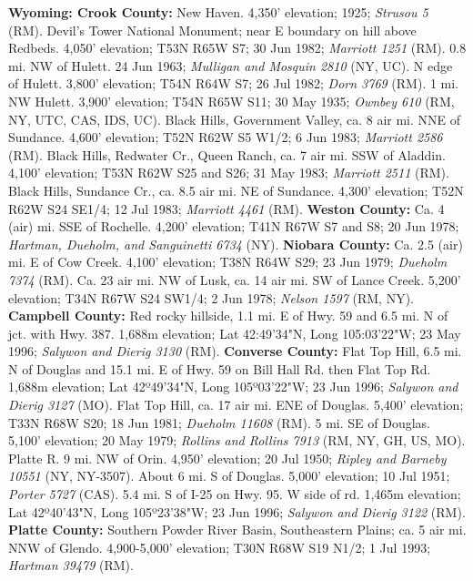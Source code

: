   \textbf{Wyoming: Crook County:}
New Haven. 4,350’ elevation; 1925; \textit{Strusou 5} (RM).
Devil's Tower National Monument; near E boundary on hill above Redbeds. 4,050' elevation; T53N R65W S7; 30 Jun 1982; \textit{Marriott 1251} (RM).
0.8 mi. NW of Hulett. 24 Jun 1963; \textit{Mulligan and Mosquin 2810} (NY, UC).
N edge of Hulett. 3,800' elevation; T54N R64W S7; 26 Jul 1982; \textit{Dorn 3769} (RM).
1 mi. NW Hulett. 3,900' elevation; T54N R65W S11; 30 May 1935; \textit{Ownbey 610} (RM, NY, UTC, CAS, IDS, UC).
Black Hills, Government Valley, ca. 8 air mi. NNE of Sundance. 4,600' elevation; T52N R62W S5 W1/2; 6 Jun 1983; \textit{Marriott 2586} (RM).
Black Hills, Redwater Cr., Queen Ranch, ca. 7 air mi. SSW of Aladdin. 4,100' elevation; T53N R62W S25 and S26; 31 May 1983; \textit{Marriott 2511} (RM).
Black Hills, Sundance Cr., ca. 8.5 air mi. NE of Sundance. 4,300' elevation; T52N R62W S24 SE1/4; 12 Jul 1983; \textit{Marriott 4461} (RM).
  \textbf{Weston County:}
Ca. 4 (air) mi. SSE of Rochelle. 4,200' elevation; T41N R67W S7 and S8; 20 Jun 1978; \textit{Hartman, Dueholm, and Sanguinetti 6734} (NY).
  \textbf{Niobara County:}
Ca. 2.5 (air) mi. E of Cow Creek. 4,100' elevation; T38N R64W S29; 23 Jun 1979; \textit{Dueholm 7374} (RM).
Ca. 23 air mi. NW of Lusk, ca. 14 air mi. SW of Lance Creek. 5,200' elevation; T34N R67W S24 SW1/4; 2 Jun 1978; \textit{Nelson 1597} (RM, NY).
  \textbf{Campbell County:}
Red rocky hillside, 1.1 mi. E of Hwy. 59 and 6.5 mi. N of jct. with Hwy. 387. 1,688m elevation; Lat 42:49'34"N, Long 105:03'22"W; 23 May 1996; \textit{Salywon and Dierig 3130} (RM).
  \textbf{Converse County:}
Flat Top Hill, 6.5 mi. N of Douglas and 15.1 mi. E of Hwy. 59 on Bill Hall Rd. then Flat Top Rd. 1,688m elevation; Lat 42º49'34"N, Long 105º03'22"W; 23 Jun 1996; \textit{Salywon and Dierig 3127} (MO).
Flat Top Hill, ca. 17 air mi. ENE of Douglas. 5,400' elevation; T33N R68W S20; 18 Jun 1981; \textit{Dueholm 11608} (RM).
5 mi. SE of Douglas. 5,100' elevation; 20 May 1979; \textit{Rollins and Rollins 7913} (RM, NY, GH, US, MO).
Platte R. 9 mi. NW of Orin. 4,950' elevation; 20 Jul 1950; \textit{Ripley and Barneby 10551} (NY, NY-3507).
About 6 mi. S of Douglas. 5,000' elevation; 10 Jul 1951; \textit{Porter 5727} (CAS).
5.4 mi. S of I-25 on Hwy. 95. W side of rd. 1,465m elevation; Lat 42º40'43"N, Long 105º23'38"W; 23 Jun 1996; \textit{Salywon and Dierig 3122} (RM).
  \textbf{Platte County:}
Southern Powder River Basin, Southeastern Plains; ca. 5 air mi. NNW of Glendo. 4,900-5,000' elevation; T30N R68W S19 N1/2; 1 Jul 1993; \textit{Hartman 39479} (RM).
